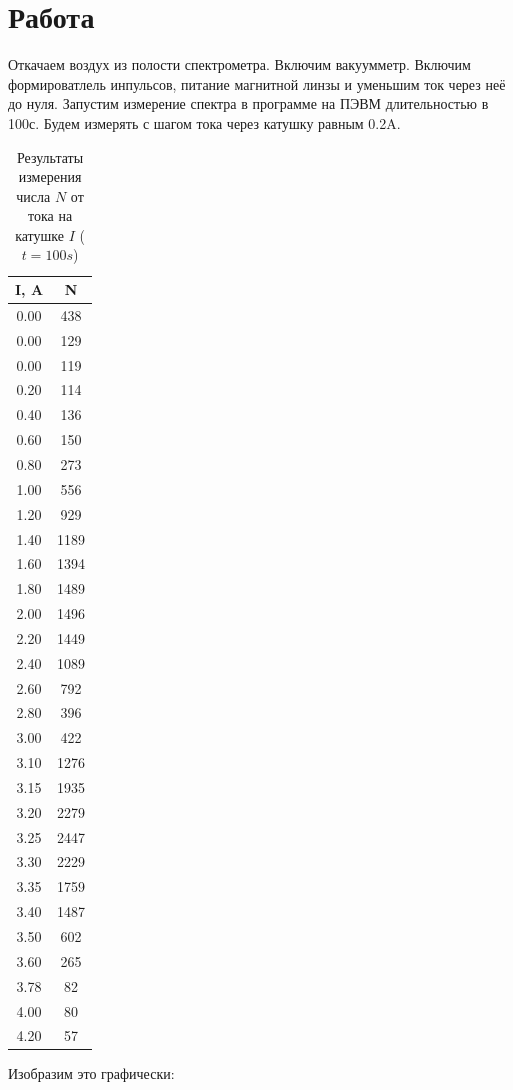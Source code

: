 \documentclass{article}
\begin{document}
\section{Работа}

Откачаем воздух из полости спектрометра. Включим вакуумметр. Включим формироватлель
инпульсов, питание магнитной линзы и уменьшим ток через неё до нуля. Запустим измерение
спектра в программе на ПЭВМ длительностью в 100с. Будем измерять с шагом тока через катушку равным 0.2A.

\begin{table}[h]
	\centering
\begin{tabular}{|c|c|}
\hline
I, A & N    \\\hline
0.00 & 438  \\\hline
0.00 & 129  \\\hline
0.00 & 119  \\\hline
0.20 & 114  \\\hline
0.40 & 136  \\\hline
0.60 & 150  \\\hline
0.80 & 273  \\\hline
1.00 & 556  \\\hline
1.20 & 929  \\\hline
1.40 & 1189 \\\hline
1.60 & 1394 \\\hline
1.80 & 1489 \\\hline
2.00 & 1496 \\\hline
2.20 & 1449 \\\hline
2.40 & 1089 \\\hline
2.60 & 792  \\\hline
2.80 & 396  \\\hline
3.00 & 422  \\\hline
3.10 & 1276 \\\hline
3.15 & 1935 \\\hline
3.20 & 2279 \\\hline
3.25 & 2447 \\\hline
3.30 & 2229 \\\hline
3.35 & 1759 \\\hline
3.40 & 1487 \\\hline
3.50 & 602  \\\hline
3.60 & 265  \\\hline
3.78 & 82   \\\hline
4.00 & 80   \\\hline
4.20 & 57   \\\hline 
\end{tabular}
	\caption{Результаты измерения числа \(N\) от тока на катушке \(I\) (\(t = 100s\))}
\end{table}
Изобразим это графически:
\end{document}
